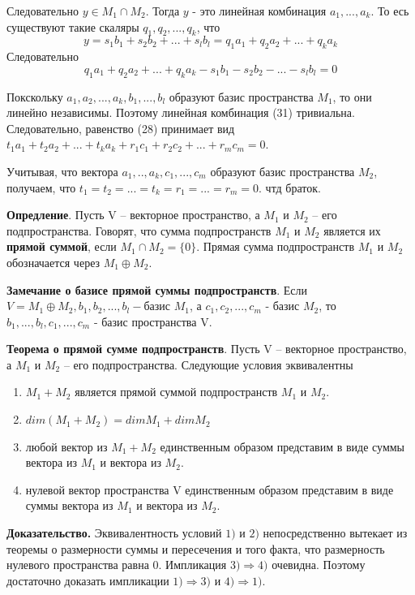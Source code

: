 \documentclass[a4paper]{article}
\begin{document}
{\begin{small}
Следовательно $y \in M_1 \cap M_2$. Тогда $y$ - это линейная комбинация $a_1, ..., a_k$. То есь существуют такие скаляры $q_1, q_2, ..., q_k$, что 
\begin{equation}
y = s_1b_1+s_2b_2+...+s_lb_l = q_1a_1 + q_2a_2 + ... + q_ka_k
\end{equation}
Следовательно 
\begin{equation}
q_1a_1 + q_2a_2 + ... + q_ka_k - s_1b_1 - s_2b_2-... - s_lb_l = 0
\end{equation}

Покскольку $a_1, a_2, ..., a_k, b_1, ..., b_l$ образуют базис пространства $M_1$, то они линейно независимы. Поэтому линейная комбинация (31) тривиальна. Следовательно, равенство (28) принимает вид $t_1a_1 +t_2a_2 + ... + t_ka_k +r_1c_1 + r_2c_2 + ... + r_mc_m = 0$.

Учитывая, что вектора $a_1, .., a_k, c_1, ..., c_m$ образуют базис пространства $M_2$, получаем, что $t_1 = t_2 = ... = t_k = r_1 = ... = r_m = 0$. чтд браток.

\textbf{Опредление}. Пусть V – векторное пространство, а $M_1$ и $M_2$ – его подпространства.
Говорят, что сумма подпространств $M_1$ и $M_2$ является их \textbf{прямой суммой},
если $M_1 \cap M_2 =\{ 0 \}$. Прямая сумма подпространств $M_1$ и $M_2$
обозначается через $M_1 \oplus M_2$. 

\textbf{Замечание о базисе прямой суммы подпространств}. Если $V = M_1 \oplus M_2, b_1, b_2, ..., b_l - $базис $M_1$, а $c_1, c_2, ..., c_m$ - базис $M_2$, то $b_1, ..., b_l, c_1, ..., c_m$ - базис пространства V.

\textbf{Теорема о прямой сумме подпространств}. Пусть V – векторное пространство, а $M_1$ и $M_2$ – его подпространства. Следующие условия эквивалентны \begin{enumerate}
\item $M_1 + M_2$ является прямой суммой подпространств $M_1$ и $M_2$.
\item $dim(M_1+M_2) = dim M_1 + dim M_2$
\item любой вектор из $M_1+M_2$ единственным образом представим в виде суммы вектора из $M_1$ и вектора из $M_2$.
\item нулевой вектор пространства V единственным образом представим в виде суммы вектора из $M_1$ и вектора из $M_2$.
\end{enumerate}

\textbf{Доказательство.} Эквивалентность условий $1)$ и $2)$ непосредственно
вытекает из теоремы о размерности суммы и пересечения и того факта,
что размерность нулевого пространства равна 0. Импликация $3) \Rightarrow 4)$
очевидна. Поэтому достаточно доказать импликации $1) \Rightarrow 3)$ и $4) \Rightarrow 1)$.


\end{small}}
\end{document}
